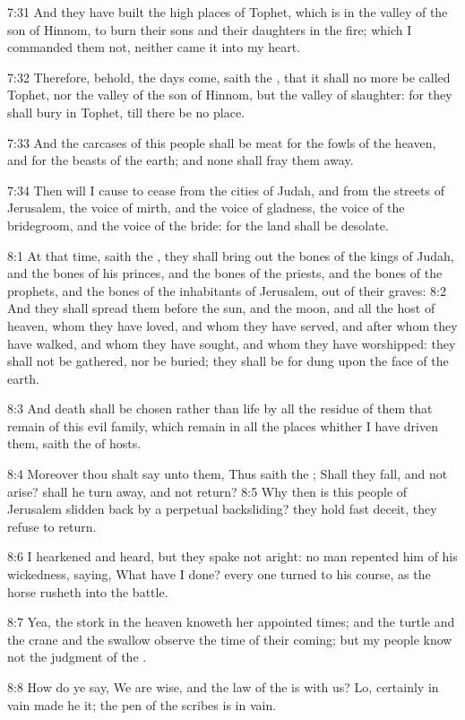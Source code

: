 7:31 And they have built the high places of Tophet, which is in the
valley of the son of Hinnom, to burn their sons and their daughters in
the fire; which I commanded them not, neither came it into my heart.

7:32 Therefore, behold, the days come, saith the \LORD, that it shall
no more be called Tophet, nor the valley of the son of Hinnom, but the
valley of slaughter: for they shall bury in Tophet, till there be no
place.

7:33 And the carcases of this people shall be meat for the fowls of
the heaven, and for the beasts of the earth; and none shall fray them
away.

7:34 Then will I cause to cease from the cities of Judah, and from the
streets of Jerusalem, the voice of mirth, and the voice of gladness,
the voice of the bridegroom, and the voice of the bride: for the land
shall be desolate.

8:1 At that time, saith the \LORD, they shall bring out the bones of
the kings of Judah, and the bones of his princes, and the bones of the
priests, and the bones of the prophets, and the bones of the
inhabitants of Jerusalem, out of their graves: 8:2 And they shall
spread them before the sun, and the moon, and all the host of heaven,
whom they have loved, and whom they have served, and after whom they
have walked, and whom they have sought, and whom they have worshipped:
they shall not be gathered, nor be buried; they shall be for dung upon
the face of the earth.

8:3 And death shall be chosen rather than life by all the residue of
them that remain of this evil family, which remain in all the places
whither I have driven them, saith the \LORD of hosts.

8:4 Moreover thou shalt say unto them, Thus saith the \LORD; Shall they
fall, and not arise? shall he turn away, and not return?  8:5 Why then
is this people of Jerusalem slidden back by a perpetual backsliding?
they hold fast deceit, they refuse to return.

8:6 I hearkened and heard, but they spake not aright: no man repented
him of his wickedness, saying, What have I done? every one turned to
his course, as the horse rusheth into the battle.

8:7 Yea, the stork in the heaven knoweth her appointed times; and the
turtle and the crane and the swallow observe the time of their coming;
but my people know not the judgment of the \LORD.

8:8 How do ye say, We are wise, and the law of the \LORD is with us?
Lo, certainly in vain made he it; the pen of the scribes is in vain.

